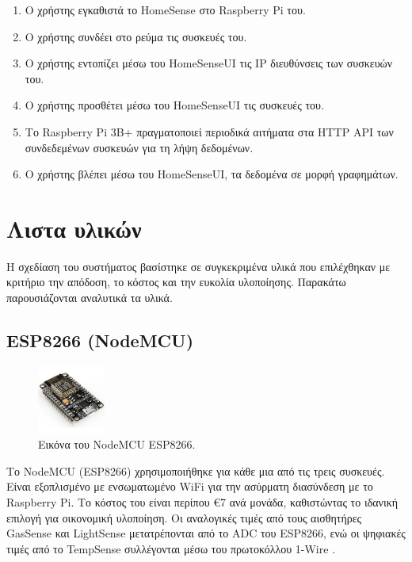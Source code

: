 \documentclass[conference]{IEEEtran}
\begin{document}
\begin{enumerate}
	\item Ο χρήστης εγκαθιστά το HomeSense στο Raspberry Pi του.
	\item Ο χρήστης συνδέει στο ρεύμα τις συσκευές του.
	\item Ο χρήστης εντοπίζει μέσω του HomeSenseUI τις IP διευθύνσεις των συσκευών του.
	\item Ο χρήστης προσθέτει μέσω του HomeSenseUI τις συσκευές του.
	\item Το Raspberry Pi 3B+ πραγματοποιεί περιοδικά αιτήματα στα HTTP API των συνδεδεμένων συσκευών για τη λήψη δεδομένων.
	\item Ο χρήστης βλέπει μέσω του HomeSenseUI, τα δεδομένα σε μορφή γραφημάτων.
\end{enumerate}

\section{Λιστα υλικών}

Η σχεδίαση του συστήματος βασίστηκε σε συγκεκριμένα υλικά που επιλέχθηκαν με κριτήριο την απόδοση, το κόστος και την ευκολία υλοποίησης. Παρακάτω παρουσιάζονται αναλυτικά τα υλικά.

\subsection{ESP8266 (NodeMCU)}

\begin{figure}[H]
	\centerline{\includegraphics[width=0.2\textwidth]{assets/nodemcu.jpg}}
	\caption{Εικόνα του NodeMCU ESP8266.}
	\label{Εικόνα του NodeMCU ESP8266.}
\end{figure}

Το NodeMCU (ESP8266) χρησιμοποιήθηκε για κάθε μια από τις τρεις συσκευές. Είναι εξοπλισμένο με ενσωματωμένο WiFi για την ασύρματη διασύνδεση με το Raspberry Pi. Το κόστος του είναι περίπου €7 ανά μονάδα, καθιστώντας το ιδανική επιλογή για οικονομική υλοποίηση. \cite{esp8266}  Οι αναλογικές τιμές από τους αισθητήρες GasSense και LightSense μετατρέπονται από το ADC \cite{adc} του ESP8266, ενώ οι ψηφιακές τιμές από το TempSense συλλέγονται μέσω του πρωτοκόλλου 1-Wire \cite{ds18b20-1wire}.
\end{document}
